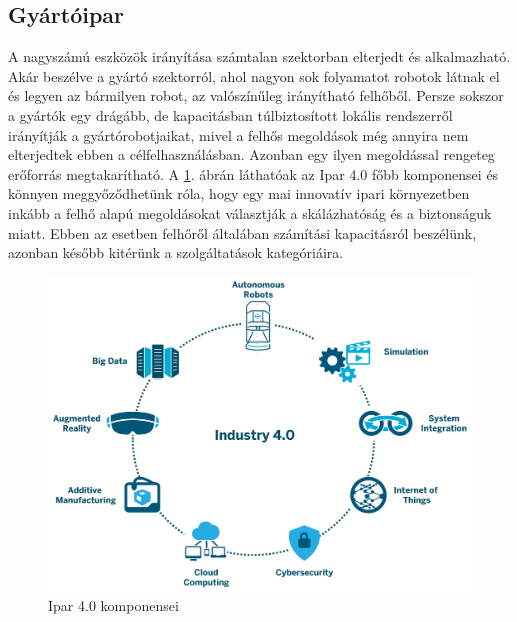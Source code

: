 \subsection{Gyártóipar}
A nagyszámú eszközök irányítása számtalan szektorban elterjedt és alkalmazható. Akár beszélve a gyártó szektorról, ahol nagyon sok folyamatot robotok látnak el és legyen az bármilyen robot, az valószínűleg irányítható felhőből. Persze sokszor a gyártók egy drágább, de kapacitásban túlbiztosított lokális rendszerről irányítják a gyártórobotjaikat, mivel a felhős megoldások még annyira nem elterjedtek ebben a célfelhasználásban. Azonban egy ilyen megoldással rengeteg erőforrás megtakarítható.
A \ref{fig:industry40}. ábrán láthatóak az Ipar 4.0 főbb komponensei és könnyen meggyőződhetünk róla, hogy egy mai innovatív ipari környezetben inkább a felhő alapú megoldásokat választják a skálázhatóság és a biztonságuk miatt. Ebben az esetben felhőről általában számítási kapacitásról beszélünk, azonban később kitérünk a szolgáltatások kategóriáira.
\begin{figure}
	\centering
	\includegraphics[width=\linewidth]{figures/industry40.png}
	\caption{Ipar 4.0 komponensei \cite{industry40}}
	\label{fig:industry40}
\end{figure}


